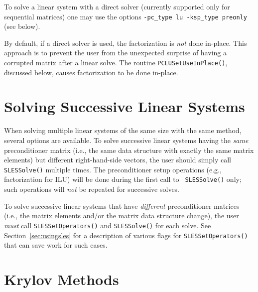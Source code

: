 To solve a linear system with a direct solver (currently supported 
only for sequential matrices) one may use the options
{\tt -pc\_type lu -ksp\_type preonly} (see below).

By default, if a direct solver is used, the factorization is {\em not} done 
in-place. This approach is to prevent the user from the unexpected surprise
of having a corrupted matrix after a linear solve. The routine 
{\tt PCLUSetUseInPlace()}, discussed below, causes factorization to 
be done in-place.  

\section{Solving Successive Linear Systems}

When solving multiple linear systems of the same size with the same
method, several options are available.  To solve successive linear
systems having the {\em same} preconditioner matrix (i.e., the same
data structure with exactly the same matrix elements) but different
right-hand-side vectors, the user should simply call {\tt SLESSolve()}
multiple times.  The preconditioner setup operations (e.g.,
factorization for ILU) will be done during the first call to {\tt
SLESSolve()} only; such operations will {\em not} be repeated for
successive solves.

To solve successive linear systems that have {\em different}
preconditioner matrices (i.e., the matrix elements and/or the matrix
data structure change), the user {\em must} call 
{\tt SLESSetOperators()} and {\tt SLESSolve()} for each solve.  See
Section~\ref{sec:usingsles} for a description of various flags for
{\tt SLESSetOperators()} that can save work for such cases.

\section{Krylov Methods}
\label{sec:ksp}

